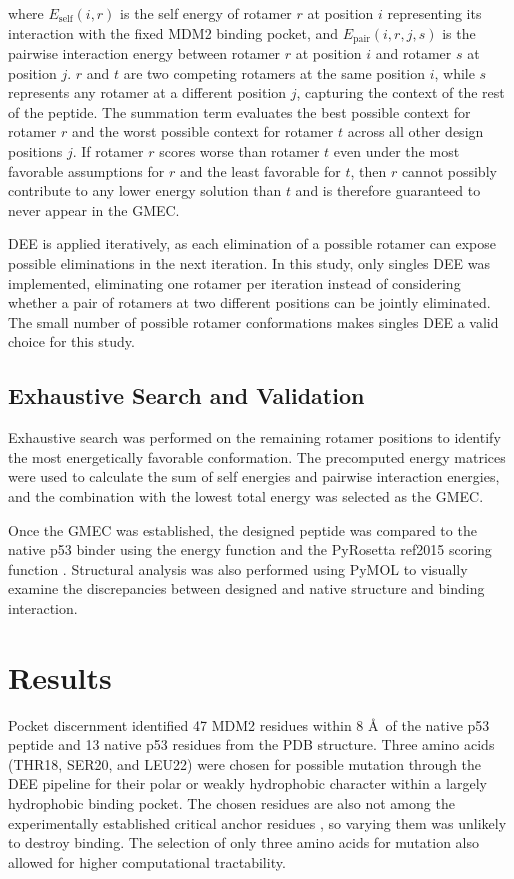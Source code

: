 where $E_{\text{self}}(i, r)$ is the self energy of rotamer $r$ at position 
$i$ representing its interaction with the fixed MDM2 binding pocket, and 
$E_{\text{pair}}(i, r, j, s)$ is the pairwise interaction energy between 
rotamer $r$ at position $i$ and rotamer $s$ at position $j$. $r$ and 
$t$ are two competing rotamers at the same position $i$, while $s$ represents 
any rotamer at a different position $j$, capturing the context 
of the rest of the peptide. The summation term evaluates the best possible context for rotamer $r$ and the worst possible context for rotamer $t$ across all other design positions $j$. If rotamer $r$ scores worse than rotamer $t$ even under the most favorable assumptions for $r$ and the least favorable for $t$, then $r$ cannot possibly contribute to any lower energy solution than $t$ and is therefore guaranteed to never appear in the GMEC.

DEE is applied iteratively, as each elimination of a possible rotamer can expose possible eliminations in the next iteration. In this study, only singles DEE was implemented, eliminating one rotamer per iteration instead of considering whether a pair of rotamers at two different positions can be jointly eliminated. The small number of possible rotamer conformations makes singles DEE a valid choice for this study.

\subsection{Exhaustive Search and Validation}
Exhaustive search was performed on the remaining rotamer positions to identify the most energetically favorable conformation. The precomputed energy matrices were used to calculate the sum of self energies and pairwise interaction energies, and the combination with the lowest total energy was selected as the GMEC.

Once the GMEC was established, the designed peptide was compared to the native p53 binder using the energy function and the PyRosetta ref2015 scoring function \cite{RosettaScoring}. Structural analysis was also performed using PyMOL \cite{PyMOL} to visually examine the discrepancies between designed and native structure and binding interaction.

\section{Results}
Pocket discernment identified 47 MDM2 residues within 8 \AA\ of the native p53 peptide and 13 native p53 residues from the PDB structure. Three amino acids (THR18, SER20, and LEU22) were chosen for possible mutation through the DEE pipeline for their polar or weakly hydrophobic character within a largely hydrophobic binding pocket. The chosen residues are also not among the experimentally established critical anchor residues \cite{anchor}, so varying them was unlikely to destroy binding. The selection of only three amino acids for mutation also allowed for higher computational tractability.

